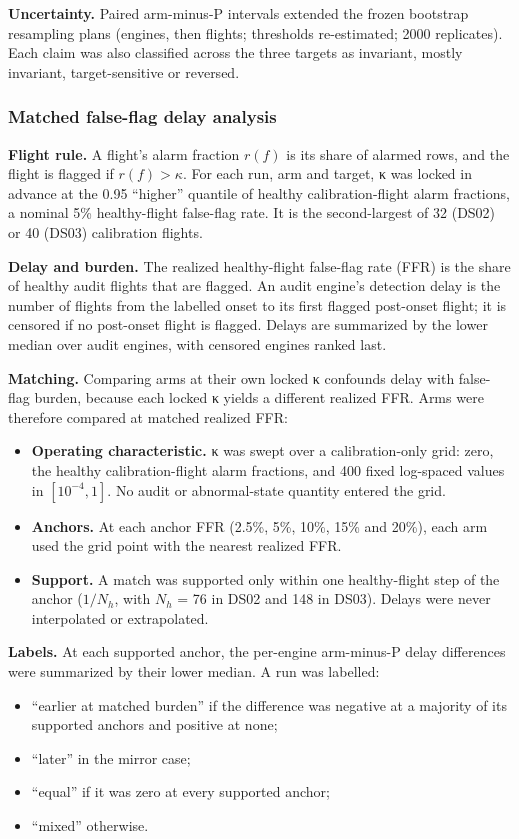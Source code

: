 \documentclass[preprint,11pt,a4paper]{elsarticle}
\begin{document}
\textbf{Uncertainty.} Paired arm-minus-P intervals extended the frozen bootstrap resampling plans (engines, then flights; thresholds re-estimated; 2000 replicates). Each claim was also classified across the three targets as invariant, mostly invariant, target-sensitive or reversed.

\subsubsection{Matched false-flag delay analysis}

\textbf{Flight rule.} A flight's alarm fraction $r(f)$ is its share of alarmed rows, and the flight is flagged if $r(f) > \kappa$. For each run, arm and target, κ was locked in advance at the 0.95 ``higher'' quantile of healthy calibration-flight alarm fractions, a nominal 5\% healthy-flight false-flag rate. It is the second-largest of 32 (DS02) or 40 (DS03) calibration flights.

\textbf{Delay and burden.} The realized healthy-flight false-flag rate (FFR) is the share of healthy audit flights that are flagged. An audit engine's detection delay is the number of flights from the labelled onset to its first flagged post-onset flight; it is censored if no post-onset flight is flagged. Delays are summarized by the lower median over audit engines, with censored engines ranked last.

\textbf{Matching.} Comparing arms at their own locked κ confounds delay with false-flag burden, because each locked κ yields a different realized FFR. Arms were therefore compared at matched realized FFR:
\begin{itemize}
\item \textbf{Operating characteristic.} κ was swept over a calibration-only grid: zero, the healthy calibration-flight alarm fractions, and 400 fixed log-spaced values in $[10^{-4}, 1]$. No audit or abnormal-state quantity entered the grid.
\item \textbf{Anchors.} At each anchor FFR (2.5\%, 5\%, 10\%, 15\% and 20\%), each arm used the grid point with the nearest realized FFR.
\item \textbf{Support.} A match was supported only within one healthy-flight step of the anchor ($1/N_h$, with $N_h$ = 76 in DS02 and 148 in DS03). Delays were never interpolated or extrapolated.
\end{itemize}

\textbf{Labels.} At each supported anchor, the per-engine arm-minus-P delay differences were summarized by their lower median. A run was labelled:
\begin{itemize}
\item ``earlier at matched burden'' if the difference was negative at a majority of its supported anchors and positive at none;
\item ``later'' in the mirror case;
\item ``equal'' if it was zero at every supported anchor;
\item ``mixed'' otherwise.
\end{itemize}
\end{document}
